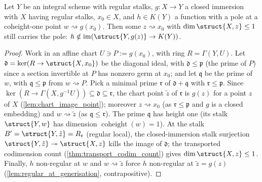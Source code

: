 \begin{theorem}
  \label{thm:transport_kernel}
  \leanok
  Let \(Y\) be an integral scheme with regular stalks, \(g : X \to Y\) a closed
  immersion with \(X\) having regular stalks, \(x_0 \in X\), and \(h \in K(Y)\) a
  function with a pole at a coheight-one point \(w \rightsquigarrow g(x_0)\). Then
  some \(z \rightsquigarrow x_0\) with \(\dim\struct{X,z} \le 1\) still carries
  the pole: \(h \notin \operatorname{im}(\struct{Y,g(z)} \to K(Y))\).
\end{theorem}
\begin{proof}
  \leanok
  Work in an affine chart \(U \ni P := g(x_0)\), with ring \(R = \Gamma(Y, U)\).
  Let \(\mathfrak d = \ker(R \to \struct{X,x_0})\) be the diagonal ideal, with
  \(\mathfrak d \le \mathfrak p\) (the prime of \(P\)) since a section invertible
  at \(P\) has nonzero germ at \(x_0\); and let \(\mathfrak q\) be the prime of
  \(w\), with \(\mathfrak q \le \mathfrak p\) from \(w \rightsquigarrow P\). Pick
  a minimal prime \(\mathfrak r\) of \(\mathfrak d + \mathfrak q\) with
  \(\mathfrak r \le \mathfrak p\). Since \(\ker(R \to \Gamma(X, g^{-1}U))
  \subseteq \mathfrak d \subseteq \mathfrak r\), the chart point \(\tilde z\) of
  \(\mathfrak r\) is \(g(z)\) for a point \(z\) of \(X\)
  (\ref{lem:chart_image_point}); moreover \(z \rightsquigarrow x_0\) (as
  \(\mathfrak r \le \mathfrak p\) and \(g\) is a closed embedding) and
  \(w \rightsquigarrow \tilde z\) (as \(\mathfrak q \le \mathfrak r\)). The prime
  \(\mathfrak q\) has height one (its stalk \(\struct{Y,w}\) has dimension
  \(\operatorname{coheight}(w) = 1\)). At the stalk \(B' = \struct{Y,\tilde z} =
  R_{\mathfrak r}\) (regular local), the closed-immersion stalk surjection
  \(\struct{Y,\tilde z} \twoheadrightarrow \struct{X,z}\) kills the image of
  \(\mathfrak d\); the transported codimension count
  (\ref{thm:transport_codim_count}) gives \(\dim\struct{X,z} \le 1\). Finally,
  \(h\) non-regular at \(w\) and \(w \rightsquigarrow \tilde z\) force \(h\)
  non-regular at \(\tilde z = g(z)\) (\ref{lem:regular_at_generisation},
  contrapositive).
\end{proof}


